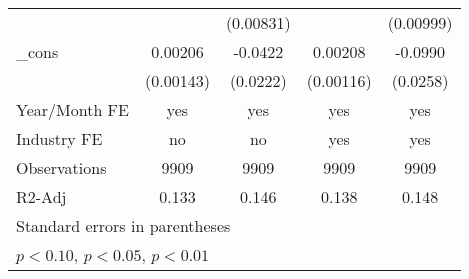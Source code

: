 \begin{table}[htbp]
\begin{tabular}{l*{4}{c}}
                &                  &(0.00831)         &                  &(0.00999)         \\
\_cons          &  0.00206         &  -0.0422\sym{*}  &  0.00208\sym{*}  &  -0.0990\sym{***}\\
                &(0.00143)         & (0.0222)         &(0.00116)         & (0.0258)         \\
\hline
Year/Month FE   &      yes         &      yes         &      yes         &      yes         \\
Industry FE     &       no         &       no         &      yes         &      yes         \\
Observations    &     9909         &     9909         &     9909         &     9909         \\
R2-Adj          &    0.133         &    0.146         &    0.138         &    0.148         \\
\hline\hline
\multicolumn{5}{l}{\footnotesize Standard errors in parentheses}\\
\multicolumn{5}{l}{\footnotesize \sym{*} \(p<0.10\), \sym{**} \(p<0.05\), \sym{***} \(p<0.01\)}\\
\end{tabular}
\end{table}
